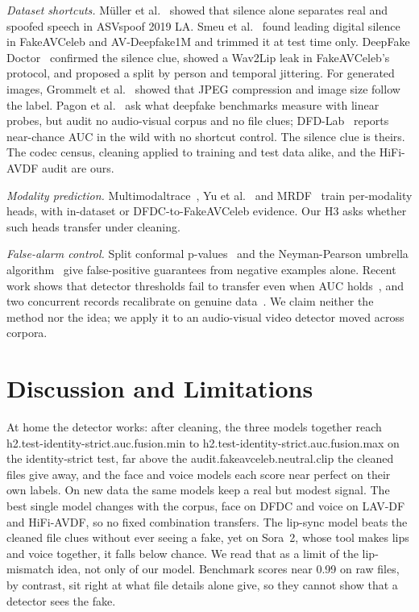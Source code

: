 \documentclass[conference]{IEEEtran}
\begin{document}
\textit{Dataset shortcuts.} M\"uller et al.~\cite{muller2021} showed that
silence alone separates real and spoofed speech in ASVspoof 2019 LA. Smeu et
al.~\cite{smeu2025} found leading digital silence in FakeAVCeleb and
AV-Deepfake1M and trimmed it at test time only. DeepFake Doctor~\cite{deepfakedoctor}
confirmed the silence clue, showed a Wav2Lip leak in FakeAVCeleb's protocol,
and proposed a split by person and temporal jittering. For generated images,
Grommelt et al.~\cite{grommelt} showed that JPEG compression and image size
follow the label. Pagon et al.~\cite{pagon2026} ask what deepfake benchmarks
measure with linear probes, but audit no audio-visual corpus and no file clues;
DFD-Lab~\cite{dfdlab2026} reports near-chance AUC in the wild with no shortcut
control. The silence clue is theirs. The codec census, cleaning applied to
training and test data alike, and the HiFi-AVDF audit are ours.

\textit{Modality prediction.} Multimodaltrace~\cite{multimodaltrace}, Yu et
al.~\cite{yu2023} and MRDF~\cite{mrdf} train per-modality heads, with
in-dataset or DFDC-to-FakeAVCeleb evidence. Our H3 asks whether such heads
transfer under cleaning.

\textit{False-alarm control.} Split conformal p-values~\cite{bates2023} and the
Neyman-Pearson umbrella algorithm~\cite{tong2018} give false-positive
guarantees from negative examples alone. Recent work shows that detector
thresholds fail to transfer even when AUC holds~\cite{nguyen2026, laionmobile},
and two concurrent records recalibrate on genuine data~\cite{mahdaoui2026,
pgag2026}. We claim neither the method nor the idea; we apply it to an
audio-visual video detector moved across corpora.

\section{Discussion and Limitations}
\label{sec:discussion}

At home the detector works: after cleaning, the three models together reach
{{h2.test-identity-strict.auc.fusion.min}} to
{{h2.test-identity-strict.auc.fusion.max}} on the identity-strict test, far
above the {{audit.fakeavceleb.neutral.clip}} the cleaned files give away, and
the face and voice models each score near perfect on their own labels. On new
data the same models keep a real but modest signal. The best single model
changes with the corpus, face on DFDC and voice on LAV-DF and HiFi-AVDF, so no
fixed combination transfers. The lip-sync model beats the cleaned file clues
without ever seeing a fake, yet on Sora~2, whose tool makes lips and voice
together, it falls below chance. We read that as a limit of the lip-mismatch
idea, not only of our model. Benchmark scores near 0.99 on raw files, by
contrast, sit right at what file details alone give, so they cannot show that
a detector sees the fake.
\end{document}
